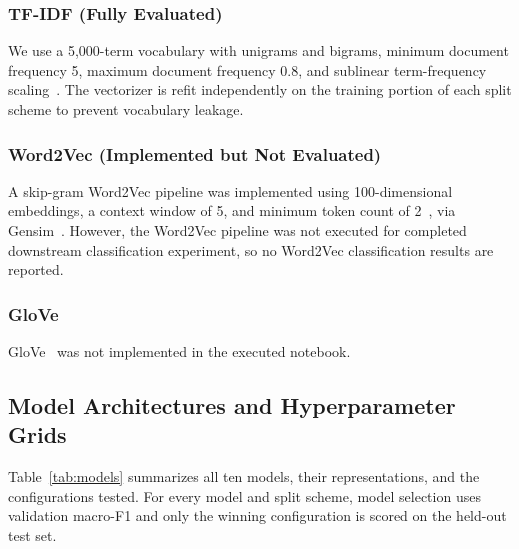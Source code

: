 \documentclass[11pt]{article}
\begin{document}
\subsubsection{TF-IDF (Fully Evaluated)}

We use a 5,000-term vocabulary with unigrams and bigrams, minimum document frequency 5, maximum document frequency 0.8, and sublinear term-frequency scaling~\cite{pedregosa-etal-2011-scikit}. The vectorizer is refit independently on the training portion of each split scheme to prevent vocabulary leakage.

\subsubsection{Word2Vec (Implemented but Not Evaluated)}

A skip-gram Word2Vec pipeline was implemented using 100-dimensional embeddings, a context window of 5, and minimum token count of 2~\cite{mikolov-etal-2013-efficient}, via Gensim~\cite{rehurek-sojka-2010-software}. However, the Word2Vec pipeline was not executed for completed downstream classification experiment, so no Word2Vec classification results are reported.

\subsubsection{GloVe}

GloVe~\cite{pennington-etal-2014-glove} was not implemented in the executed notebook.

\subsection{Model Architectures and Hyperparameter Grids}

Table~\ref{tab:models} summarizes all ten models, their representations, and the configurations tested. For every model and split scheme, model selection uses validation macro-F1 and only the winning configuration is scored on the held-out test set.
\end{document}
